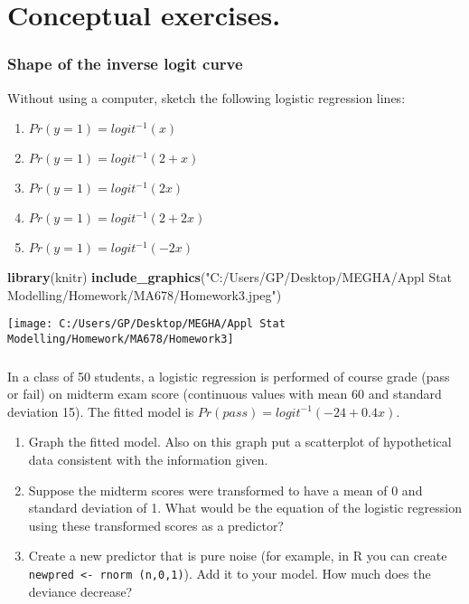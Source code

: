 \documentclass[]{article}
\newenvironment{Shaded}{\begin{snugshade}}{\end{snugshade}}
\newcommand{\KeywordTok}[1]{\textcolor[rgb]{0.13,0.29,0.53}{\textbf{#1}}}
\newcommand{\StringTok}[1]{\textcolor[rgb]{0.31,0.60,0.02}{#1}}
\newcommand{\NormalTok}[1]{#1}
\providecommand{\tightlist}{%
  \setlength{\itemsep}{0pt}\setlength{\parskip}{0pt}}
\begin{document}
\section{Conceptual exercises.}\label{conceptual-exercises.}

\subsubsection{Shape of the inverse logit
curve}\label{shape-of-the-inverse-logit-curve}

Without using a computer, sketch the following logistic regression
lines:

\begin{enumerate}
\def\labelenumi{\arabic{enumi}.}
\tightlist
\item
  \(Pr(y = 1) = logit^{-1}(x)\)
\item
  \(Pr(y = 1) = logit^{-1}(2 + x)\)
\item
  \(Pr(y = 1) = logit^{-1}(2x)\)
\item
  \(Pr(y = 1) = logit^{-1}(2 + 2x)\)
\item
  \(Pr(y = 1) = logit^{-1}(-2x)\)
\end{enumerate}

\begin{Shaded}
\begin{Highlighting}[]
\KeywordTok{library}\NormalTok{(knitr)}
\KeywordTok{include_graphics}\NormalTok{(}\StringTok{"C:/Users/GP/Desktop/MEGHA/Appl Stat Modelling/Homework/MA678/Homework3.jpeg"}\NormalTok{)}
\end{Highlighting}
\end{Shaded}

\begin{center}\texttt{[image: C:/Users/GP/Desktop/MEGHA/Appl Stat Modelling/Homework/MA678/Homework3]} \end{center}

\subsubsection{}\label{section}

In a class of 50 students, a logistic regression is performed of course
grade (pass or fail) on midterm exam score (continuous values with mean
60 and standard deviation 15). The fitted model is
\(Pr(pass) = logit^{-1}(-24+0.4x)\).

\begin{enumerate}
\def\labelenumi{\arabic{enumi}.}
\item
  Graph the fitted model. Also on this graph put a scatterplot of
  hypothetical data consistent with the information given.
\item
  Suppose the midterm scores were transformed to have a mean of 0 and
  standard deviation of 1. What would be the equation of the logistic
  regression using these transformed scores as a predictor?
\item
  Create a new predictor that is pure noise (for example, in R you can
  create \texttt{newpred\ \textless{}-\ rnorm\ (n,0,1)}). Add it to your
  model. How much does the deviance decrease?
\end{enumerate}
\end{document}
